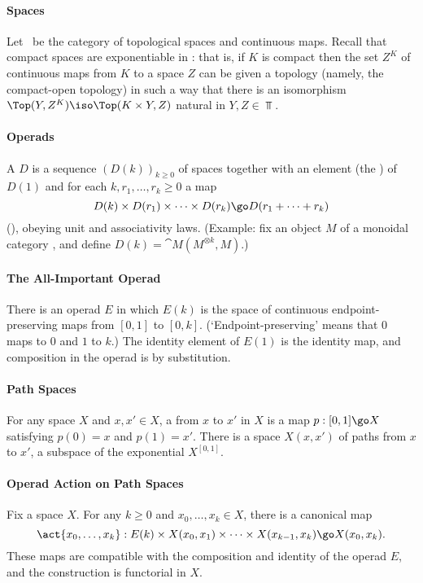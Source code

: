 
	\label{p:tr}



\paragraph{Spaces}
Let \Top\ be the category of topological spaces and continuous maps.  Recall
that compact spaces are exponentiable in \Top: that is, if $K$ is compact
then the set $Z^K$ of continuous maps from $K$ to a space
$Z$ can be given a topology (namely, the compact-open topology) in such a way
that there is an isomorphism $\Top(Y, Z^K) \iso \Top(K \times Y, Z)$
natural in $Y,Z \in \Top$.

\paragraph{Operads}
A  $D$ is a sequence
$(D(k))_{k\geq 0}$ of spaces together with an element (the
) of $D(1)$ and for each $k, r_1, \ldots, r_k \geq 0$ a map
\[
D(k) \times D(r_1) \times \cdots \times D(r_k) 	
\go						
D(r_1 + \cdots + r_k)
\]
(), obeying unit and associativity laws.  (Example: fix an
object $M$ of a monoidal category , and define $D(k) =
\cat{M}(M^{\otimes k},M)$.)

\paragraph{The All-Important Operad}
There is an operad $E$ in which $E(k)$ is the space of continuous
endpoint-preserving maps from $[0,1]$ to $[0,k]$.  (`Endpoint-preserving'
means that $0$ maps to $0$ and $1$ to $k$.)  The identity element of $E(1)$
is the identity map, and composition in the operad is by substitution.

\paragraph{Path Spaces}
For any space $X$ and $x,x'\in X$, a  from $x$ to $x'$ in $X$ is
a map $p: [0,1] \go X$ satisfying $p(0) = x$ and $p(1) = x'$.  There is a
space $X(x,x')$ of paths from $x$ to $x'$, a subspace of the exponential
$X^{[0,1]}$.

\paragraph{Operad Action on Path Spaces}
Fix a space $X$. For any $k\geq 0$ and $x_0, \ldots, x_k \in X$, there is a
canonical map
\[
\act{x_0,\ldots,x_k}: 
E(k) \times X(x_0,x_1) \times\cdots\times X(x_{k-1},x_k)
\go
X(x_0,x_k).
\]
These maps are compatible with the composition and identity of the operad
$E$,
and the construction is functorial in $X$.


